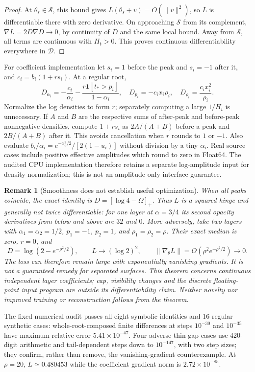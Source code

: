 \documentclass[11pt,a4paper]{article}
\newtheorem{remark}[theorem]{Remark}
\newcommand{\ind}{\mathbf{1}}
\begin{document}
\begin{proof}
At $\theta_s\in\mathcal S$, this bound gives
$L(\theta_s+v)=O(\|v\|^2)$, so $L$ is differentiable there with
zero derivative. On approaching $\mathcal S$ from its complement,
$\nabla L=2D\nabla D\to0$, by continuity of $D$ and the same local
bound. Away from $\mathcal S$, all terms are continuous with $H_t>0$.
This proves continuous differentiability everywhere in $\mathcal D$.
\end{proof}

For coefficient implementation let $s_i=1$ before the peak and $s_i=-1$
after it, and $c_i=b_i(1+rs_i)$. At a regular root,
\[
 D_{\alpha_i}=-\frac{c_i}{\alpha_i}
       -\frac{r\ind[t_*>p_i]}{1-\alpha_i},\quad
 D_{p_i}=-c_i x_i\rho_i,\quad
 D_{\rho_i}=\frac{c_i x_i^2}{\rho_i}.
\]
Normalize the log densities to form $r$; separately computing a large
$1/H_t$ is unnecessary. If $A$ and $B$ are the respective sums of
after-peak and before-peak nonnegative densities, compute
$1+rs_i$ as $2A/(A+B)$ before a peak and $2B/(A+B)$ after it.
This avoids cancellation when $r$ rounds to $1$ or $-1$. Also evaluate
$b_i/\alpha_i=e^{-x_i^2/2}/[2(1-u_i)]$ without division by a tiny
$\alpha_i$. Real source cases include positive effective amplitudes
which round to zero in Float64. The audited CPU implementation therefore
retains a separate log-amplitude input for density normalization; this
is not an amplitude-only interface guarantee.

\begin{remark}[Smoothness does not establish useful optimization]
When all peaks coincide, the exact identity is
$D=[\log4-\Omega]_+$. Thus $L$ is a squared hinge and generally not
twice differentiable: for one layer at $\alpha=3/4$ its second opacity
derivatives from below and above are $32$ and $0$.
More adversely, take two layers with $\alpha_1=\alpha_2=1/2$,
$p_1=-1$, $p_2=1$, and $\rho_1=\rho_2=\rho$.
Their exact median is zero, $r=0$, and
\[
 D=\log(2-e^{-\rho^2/2}),\qquad
 L\longrightarrow(\log2)^2,
 \qquad \|\nabla_\theta L\|=O(\rho^2e^{-\rho^2/2})\longrightarrow0.
\]
The loss can therefore remain large with exponentially vanishing
gradients. It is not a guaranteed remedy for separated surfaces.
This theorem concerns continuous independent layer coefficients; cap,
visibility changes and the discrete floating-point input program are
outside its differentiability claim. Neither novelty nor improved
training or reconstruction follows from the theorem.
\end{remark}

The fixed numerical audit passes all eight symbolic identities and
16 regular synthetic cases: whole-root-composed finite differences
at steps $10^{-30}$ and $10^{-35}$ have maximum relative error
$5.41\times10^{-47}$. Four adverse thin-gap cases use 420-digit
arithmetic and tail-dependent steps down to $10^{-147}$, with two
step sizes; they confirm, rather than remove, the vanishing-gradient
counterexample. At $\rho=20$, $L\simeq0.480453$ while the coefficient
gradient norm is $2.72\times10^{-85}$.
\end{document}
